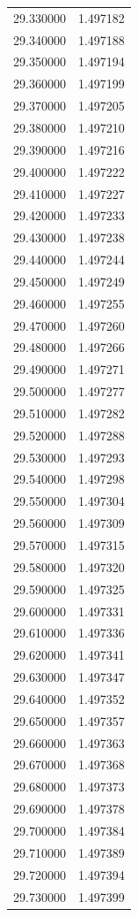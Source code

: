 \begin{tabular}{rr}
29.330000 & 1.497182 \\
29.340000 & 1.497188 \\
29.350000 & 1.497194 \\
29.360000 & 1.497199 \\
29.370000 & 1.497205 \\
29.380000 & 1.497210 \\
29.390000 & 1.497216 \\
29.400000 & 1.497222 \\
29.410000 & 1.497227 \\
29.420000 & 1.497233 \\
29.430000 & 1.497238 \\
29.440000 & 1.497244 \\
29.450000 & 1.497249 \\
29.460000 & 1.497255 \\
29.470000 & 1.497260 \\
29.480000 & 1.497266 \\
29.490000 & 1.497271 \\
29.500000 & 1.497277 \\
29.510000 & 1.497282 \\
29.520000 & 1.497288 \\
29.530000 & 1.497293 \\
29.540000 & 1.497298 \\
29.550000 & 1.497304 \\
29.560000 & 1.497309 \\
29.570000 & 1.497315 \\
29.580000 & 1.497320 \\
29.590000 & 1.497325 \\
29.600000 & 1.497331 \\
29.610000 & 1.497336 \\
29.620000 & 1.497341 \\
29.630000 & 1.497347 \\
29.640000 & 1.497352 \\
29.650000 & 1.497357 \\
29.660000 & 1.497363 \\
29.670000 & 1.497368 \\
29.680000 & 1.497373 \\
29.690000 & 1.497378 \\
29.700000 & 1.497384 \\
29.710000 & 1.497389 \\
29.720000 & 1.497394 \\
29.730000 & 1.497399 \\

\end{tabular}
